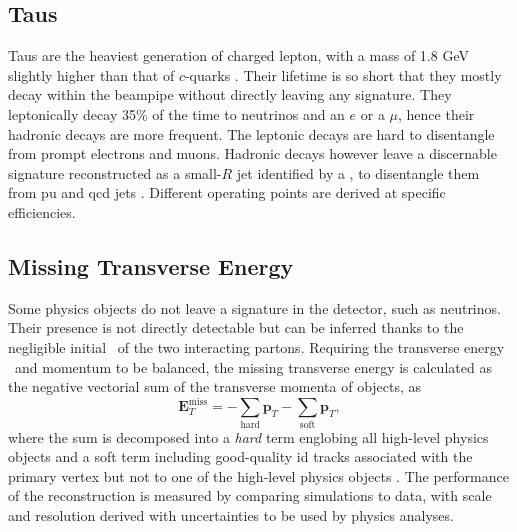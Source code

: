 \subsection{Taus}\label{sec-atlas-tau}
Taus are the heaviest generation of charged lepton, with a mass of 1.8 GeV slightly higher than that of $c$-quarks \cite{Tanabashi:2018oca}. Their lifetime is so short that they mostly decay within the beampipe without directly leaving any signature. They leptonically decay 35\% of the time to neutrinos and an $e$ or a $\mu$, hence their hadronic decays are more frequent. The leptonic decays are hard to disentangle from prompt electrons and muons. Hadronic decays however leave a discernable signature reconstructed as a small-$R$ jet identified by a , to disentangle them from \gls{pu} and \gls{qcd} jets \cite{ATL-PHYS-PUB-2019-033}. Different operating points are derived at specific efficiencies. 

\subsection{Missing Transverse Energy}\label{sec-atlas-met}
Some physics objects do not leave a signature in the detector, such as neutrinos. Their presence is not directly detectable but can be inferred thanks to the negligible initial \pt\ of the two interacting partons. Requiring the transverse energy \etm\ and momentum to be balanced, the missing transverse energy is calculated as the negative vectorial sum of the transverse momenta of objects, as
\begin{equation}
  \boldsymbol{E}_T^{\text{miss}} = - \sum_{\text{hard}} \boldsymbol{p}_T - \sum_{\text{soft}} \boldsymbol{p}_T,
\end{equation}
where the sum is decomposed into a \textit{hard} term englobing all high-level physics objects and a soft term including good-quality \gls{id} tracks associated with the primary vertex but not to one of the high-level physics objects \cite{ATLASmetReco}. The performance of the reconstruction is measured by comparing simulations to data, with scale and resolution derived with uncertainties to be used by physics analyses. 